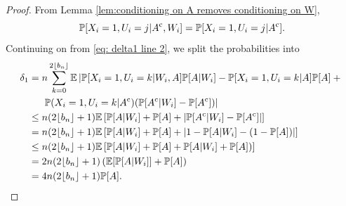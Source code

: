 \begin{proof}
		From Lemma \ref{lem:conditioning on A removes conditioning on W},
		\begin{equation}
			\mathbb{P}[X_i = 1, U_i = j | A^{\mathrm{c}}, W_i] = \mathbb{P}[X_i = 1, U_i = j | A^{\mathrm{c}}].
		\end{equation} 
		Continuing on from \eqref{eq: delta1 line 2}, we split the probabilities into
		\begin{align}
			\delta_1 &= n \sum_{k = 0}^{2 \lfloor b_n\rfloor} \expect \left| \prob[X_i = 1, U_i = k|W_i, A]\prob[A|W_i] - \prob[X_i = 1, U_i = k| A]\prob[A] + \vphantom{A^\complement} \right.\\
			&\hphantom{= .} \left.\prob(X_i = 1, U_i = k | A^\complement) (\prob[A^\complement|W_i] - \prob[A^\complement]) \right| \notag \\
			&\leq n (2\lfloor b_n\rfloor+1) \expect\left[ \prob[A|W_i] + \prob[A] + \left|\prob[A^\complement|W_i] - \prob[A^\complement]\right|\right]\\
			&= n (2\lfloor b_n\rfloor + 1) \expect\left[ \prob[A|W_i] + \prob[A] + \left|1 - \prob[A|W_i] - (1 - \prob[A])\right|\right]\\
			&\leq n (2\lfloor b_n\rfloor + 1) \expect\left[ \prob[A|W_i] + \prob[A] + \prob[A|W_i] + \prob[A])\right]\\
			&= 2 n (2\lfloor b_n\rfloor + 1) \left(\expect[\prob[A|W_i]] + \prob[A]\right)\\
			&= 4 n (2\lfloor b_n\rfloor + 1) \prob[A].
		\end{align}
		

\end{proof}
